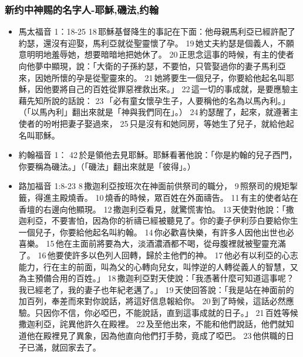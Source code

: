 \subsubsection{新约中神赐的名字人-耶穌,磯法,约翰}
\begin{itemize} 
\itemsep-.25em
\item 馬太福音 1：18-25
18 耶穌基督降生的事記在下面：他母親馬利亞已經許配了約瑟，還沒有迎娶，馬利亞就從聖靈懷了孕。 19 她丈夫約瑟是個義人，不願意明明地羞辱她，想要暗暗地把她休了。 20 正思念這事的時候，有主的使者向他夢中顯現，說：「大衛的子孫約瑟，不要怕，只管娶過你的妻子馬利亞來，因她所懷的孕是從聖靈來的。 21 她將要生一個兒子，你要給他起名叫耶穌，因他要將自己的百姓從罪惡裡救出來。」 22 這一切的事成就，是要應驗主藉先知所說的話說： 23 「必有童女懷孕生子，人要稱他的名為以馬內利。」（「以馬內利」翻出來就是「神與我們同在」。） 24 約瑟醒了，起來，就遵著主使者的吩咐把妻子娶過來， 25 只是沒有和她同房，等她生了兒子，就給他起名叫耶穌。
\item 約翰福音 1： 42 於是領他去見耶穌。耶穌看著他說：「你是約翰的兒子西門，你要稱為磯法。」（「磯法」翻出來就是「彼得」。）
\item 路加福音 1:8-23 8 撒迦利亞按班次在神面前供祭司的職分， 9 照祭司的規矩掣籤，得進主殿燒香。 10 燒香的時候，眾百姓在外面禱告。 11 有主的使者站在香壇的右邊向他顯現。 12 撒迦利亞看見，就驚慌害怕。 13 天使對他說：「撒迦利亞，不要害怕，因為你的祈禱已經被聽見了。你的妻子伊利莎白要給你生一個兒子，你要給他起名叫約翰。 14 你必歡喜快樂，有許多人因他出世也必喜樂。 15 他在主面前將要為大，淡酒濃酒都不喝，從母腹裡就被聖靈充滿了。 16 他要使許多以色列人回轉，歸於主他們的神。 17 他必有以利亞的心志能力，行在主的前面，叫為父的心轉向兒女，叫悖逆的人轉從義人的智慧，又為主預備合用的百姓。」 18 撒迦利亞對天使說：「我憑著什麼可知道這事呢？我已經老了，我的妻子也年紀老邁了。」 19 天使回答說：「我是站在神面前的加百列，奉差而來對你說話，將這好信息報給你。 20 到了時候，這話必然應驗。只因你不信，你必啞巴，不能說話，直到這事成就的日子。」 21 百姓等候撒迦利亞，詫異他許久在殿裡。 22 及至他出來，不能和他們說話，他們就知道他在殿裡見了異象，因為他直向他們打手勢，竟成了啞巴。 23 他供職的日子已滿，就回家去了。
\end{itemize} 

